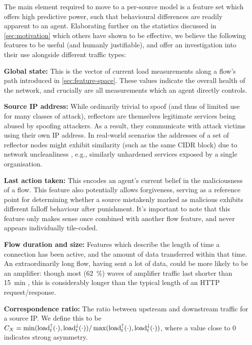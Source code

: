 \documentclass[10pt, times, conference, letterpaper]{IEEEtran}
\newcommand{\fakepara}[1]{\noindent\textbf{#1:}}
\begin{document}
The main element required to move to a per-source model is a feature set which offers high predictive power, such that behavioural differences are readily apparent to an agent.
Elaborating further on the statistics discussed in \cref{sec:motivation} which others have shown to be effective, we believe the following features to be useful (and humanly justifiable), and offer an investigation into their use alongside different traffic types:

\fakepara{Global state}
This is the vector of current load measurements along a flow's path introduced in \cref{sec:feature-space}.
These values indicate the overall health of the network, and crucially are all measurements which an agent directly controls.

\fakepara{Source IP address}
While ordinarily trivial to spoof (and thus of limited use for many classes of attack), reflectors are themselves legitimate services being abused by spoofing attackers.
As a result, they communicate with attack victims using their own IP address.
In real-world scenarios the addresses of a set of reflector nodes might exhibit similarity (such as the same CIDR block) due to network uncleanliness \cite{DBLP:conf/imc/CollinsSFJWSK07}, e.g., similarly unhardened services exposed by a single organisation.

\fakepara{Last action taken}
This encodes an agent's current belief in the maliciousness of a flow.
This feature also potentially allows forgiveness, serving as a reference point for determining whether a source mistakenly marked as malicious exhibits different falloff behaviour after punishment.
It's important to note that this feature only makes sense once combined with another flow feature, and never appears individually tile-coded.

\fakepara{Flow duration and size}
Features which describe the length of time a connection has been active, and the amount of data transferred within that time.
An extraordinarily long flow, having sent a lot of data, could be more likely to be an amplifier: though most (\SI{62}{\percent}) waves of amplifier traffic last shorter than \SI{15}{\minute} \cite{DBLP:conf/raid/KramerKMNKYR15}, this is considerably longer than the typical length of an HTTP request/response.

\fakepara{Correspondence ratio}
The ratio between upstream and downstream traffic for a source IP.
We define this to be $C_X = \min(\operatorname{load}^{\uparrow}_{t}(\cdot), \operatorname{load}^{\downarrow}_{t}(\cdot))/\max(\operatorname{load}^{\uparrow}_{t}(\cdot), \operatorname{load}^{\downarrow}_{t}(\cdot))$, where a value close to 0 indicates strong asymmetry.
\end{document}
